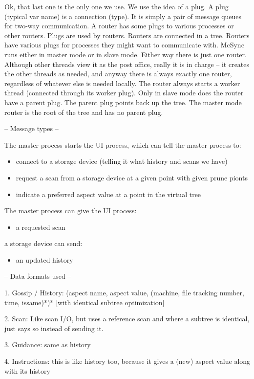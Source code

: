 \documentclass{book}
\begin{document}
Ok, that last one is the only one we use.  We use the idea of a plug.  A plug (typical var name) is a connection (type).  It is simply a pair of message queues for two-way communication.  A router has some plugs to various processes or other routers.  Plugs are used by routers.  Routers are connected in a tree.  Routers have various plugs for processes they might want to communicate with.  McSync runs either in master mode or in slave mode.  Either way there is just one router.  Although other threads view it as the post office, really it is in charge -- it creates the other threads as needed, and anyway there is always exactly one router, regardless of whatever else is needed locally.  The router always starts a worker thread (connected through its worker plug).  Only in slave mode does the router have a parent plug.  The parent plug points back up the tree.  The master mode router is the root of the tree and has no parent plug.


-- Message types --

The master process starts the UI process, which can tell the master process to:
\begin{itemize}
\item connect to a storage device (telling it what history and scans we have)
\item request a scan from a storage device at a given point with given prune pionts
\item indicate a preferred aspect value at a point in the virtual tree
\end{itemize}
The master process can give the UI process:
\begin{itemize}
\item a requested scan
\end{itemize}
a storage device can send:
\begin{itemize}
\item an updated history
\end{itemize}

-- Data formats used --

1. Gossip / History: (aspect name, aspect value, (machine, file tracking number, time, issame)*)* [with identical subtree optimization]

2. Scan:  Like scan I/O, but uses a reference scan and where a subtree is identical, just says so instead of sending it.

3. Guidance: same as history

4. Instructions: this is like history too, because it gives a (new) aspect value along with its history
\end{document}
